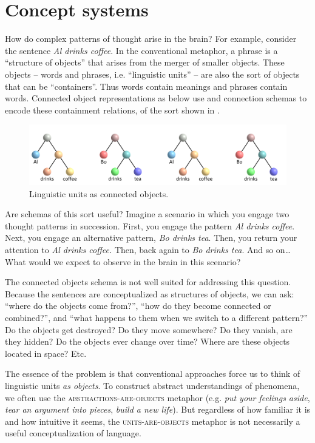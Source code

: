\section{Concept systems}

How do complex patterns of thought arise in the brain? For example, consider the sentence \textit{Al drinks coffee}. In the conventional metaphor, a phrase is a “structure of objects” that arises from the merger of smaller objects. These objects -- words and phrases, i.e. “linguistic units” -- are also the sort of objects that can be “containers”. Thus words contain meanings and phrases contain words. Connected object representations as below use  and connection schemas to encode these containment relations, of the sort shown in {}.

  
\begin{figure}
\includegraphics[width=\textwidth]{figures/Tilsen-img8.png}
\caption{Linguistic units as connected objects.}
\label{fig:2:1}
\end{figure}
 

  Are schemas of this sort useful? Imagine a scenario in which you engage two thought patterns in succession. First, you engage the pattern \textit{Al drinks coffee}. Next, you engage an alternative pattern, \textit{Bo drinks tea}. Then, you return your attention to \textit{Al drinks coffee.} Then, back again to \textit{Bo drinks tea}. And so on… What would we expect to observe in the brain in this scenario? 

  The connected objects schema is not well suited for addressing this question. Because the sentences are conceptualized as structures of objects, we can ask: “where do the objects come from?”, “how do they become connected or combined?”, and “what happens to them when we switch to a different pattern?” Do the objects get destroyed? Do they move somewhere? Do they vanish, are they hidden? Do the objects ever change over time? Where are these objects located in space? Etc.

  The essence of the problem is that conventional approaches force us to think of linguistic units \textit{as objects}. To construct abstract understandings of phenomena, we often use the \textsc{abstractions-}\textsc{are}\textsc{{}-objects} metaphor (e.g. \textit{put your feelings aside}, \textit{tear an argument into pieces}, \textit{build a new life}). But regardless of how familiar it is and how intuitive it seems, the \textsc{units}\textsc{{}-are-}\textsc{objects} metaphor is not necessarily a useful conceptualization of language. 

